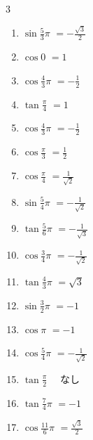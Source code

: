 \begin{multicols}{3}
\begin{enumerate}
  \item $\displaystyle \sin{\frac{5}{3}\pi}$
        $\displaystyle =-\frac{\sqrt{3}}{2}$

  \item $\displaystyle \cos{0}$
        $\displaystyle =1$

  \item $\displaystyle \cos{\frac{4}{3}\pi}$
        $\displaystyle =-\frac{1}{2}$

  \item $\displaystyle \tan{\frac{\pi}{4}}$
        $\displaystyle =1$

  \item $\displaystyle \cos{\frac{4}{3}\pi}$
        $\displaystyle =-\frac{1}{2}$

  \item $\displaystyle \cos{\frac{\pi}{3}}$
        $\displaystyle =\frac{1}{2}$

  \item $\displaystyle \cos{\frac{\pi}{4}}$
        $\displaystyle =\frac{1}{\sqrt{2}}$

  \item $\displaystyle \sin{\frac{5}{4}\pi}$
        $\displaystyle =-\frac{1}{\sqrt{2}}$

  \item $\displaystyle \tan{\frac{5}{6}\pi}$
        $\displaystyle =-\frac{1}{\sqrt{3}}$

  \item $\displaystyle \cos{\frac{3}{4}\pi}$
        $\displaystyle =-\frac{1}{\sqrt{2}}$

  \item $\displaystyle \tan{\frac{4}{3}\pi}$
        $\displaystyle =\sqrt{3}$

  \item $\displaystyle \sin{\frac{3}{2}\pi}$
        $\displaystyle =-1$

  \item $\displaystyle \cos{\pi}$
        $\displaystyle =-1$

  \item $\displaystyle \cos{\frac{5}{4}\pi}$
        $\displaystyle =-\frac{1}{\sqrt{2}}$

  \item $\displaystyle \tan{\frac{\pi}{2}}$
        $\displaystyle \quad なし$

  \item $\displaystyle \tan{\frac{7}{4}\pi}$
        $\displaystyle =-1$

  \item $\displaystyle \cos{\frac{11}{6}\pi}$
        $\displaystyle =\frac{\sqrt{3}}{2}$


\end{enumerate}
\end{multicols}
